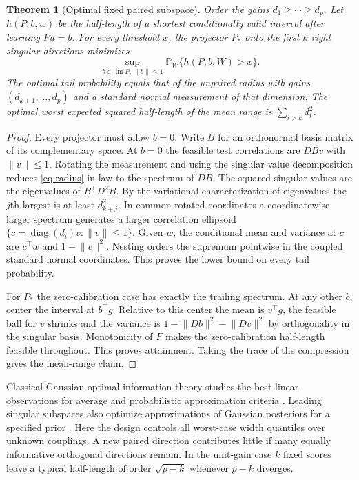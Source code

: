 \documentclass[11pt]{article}
\newtheorem{theorem}{Theorem}
\newcommand{\Prob}{\mathbb P}
\newcommand{\norm}[1]{\lVert #1\rVert}
\newcommand{\diag}{\operatorname{diag}}
\begin{document}
\begin{theorem}[Optimal fixed paired subspace]\label{thm:fixed}
Order the gains $d_1\ge\cdots\ge d_p$. Let $h(P,b,w)$ be the half-length of a shortest conditionally valid interval after learning $Pu=b$. For every threshold $x$, the projector $P_*$ onto the first $k$ right singular directions minimizes
\[
 \sup_{b\in\operatorname{im}P,\,\norm b\le1}\Prob_W\{h(P,b,W)>x\}.
\]
The optimal tail probability equals that of the unpaired radius with gains $(d_{k+1},\ldots,d_p)$ and a standard normal measurement of that dimension. The optimal worst expected squared half-length of the \emph{mean range} is $\sum_{i>k}d_i^2$.
\end{theorem}
\begin{proof}
Every projector must allow $b=0$. Write $B$ for an orthonormal basis matrix of its complementary space. At $b=0$ the feasible test correlations are $DBv$ with $\norm v\le1$. Rotating the measurement and using the singular value decomposition reduces \eqref{eq:radius} in law to the spectrum of $DB$. The squared singular values are the eigenvalues of $B^\top D^2B$. By the variational characterization of eigenvalues the $j$th largest is at least $d_{k+j}^2$. In common rotated coordinates a coordinatewise larger spectrum generates a larger correlation ellipsoid $\{c=\diag(d_i)v:\norm v\le1\}$. Given $w$, the conditional mean and variance at $c$ are $c^\top w$ and $1-\norm c^2$. Nesting orders the supremum pointwise in the coupled standard normal coordinates. This proves the lower bound on every tail probability.

For $P_*$ the zero-calibration case has exactly the trailing spectrum. At any other $b$, center the interval at $b^\top g$. Relative to this center the mean is $v^\top g$, the feasible ball for $v$ shrinks and the variance is $1-\norm{Db}^2-\norm{Dv}^2$ by orthogonality in the singular basis. Monotonicity of $F$ makes the zero-calibration half-length feasible throughout. This proves attainment. Taking the trace of the compression gives the mean-range claim.
\end{proof}
Classical Gaussian optimal-information theory studies the best linear observations for average and probabilistic approximation criteria \cite{wasilkowski}. Leading singular subspaces also optimize approximations of Gaussian posteriors for a specified prior \cite{spantini}. Here the design controls all worst-case width quantiles over unknown couplings. A new paired direction contributes little if many equally informative orthogonal directions remain. In the unit-gain case $k$ fixed scores leave a typical half-length of order $\sqrt{p-k}$ whenever $p-k$ diverges.
\end{document}
